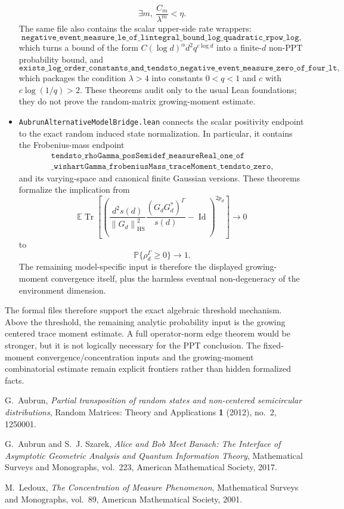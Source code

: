 \documentclass[11pt,reqno]{amsart}
\newcommand{\PP}{\mathbb P}
\newcommand{\EE}{\mathbb E}
\newcommand{\Tr}{\operatorname{Tr}}
\newcommand{\Id}{\operatorname{Id}}
\newcommand{\HS}{\mathrm{HS}}
\newcommand{\norm}[1]{\left\lVert #1\right\rVert}
\begin{document}
\begin{itemize}[leftmargin=*]
\[    \exists m,\ \frac{C_m}{\lambda^m}<\eta .
  \]
  The same file also contains the scalar upper-side rate wrappers:
  \[
    \texttt{negative\_event\_measure\_le\_of\_lintegral\_bound\_log\_quadratic\_rpow\_log},
  \]
  which turns a bound of the form
  \(C(\log d)^\alpha d^2q^{c\log d}\) into a finite-\(d\) non-PPT
  probability bound, and
  \[
    \texttt{exists\_log\_order\_constants\_and\_tendsto\_negative\_event\_measure\_zero\_of\_four\_lt},
  \]
  which packages the condition \(\lambda>4\) into constants
  \(0<q<1\) and \(c\) with \(c\log(1/q)>2\).  These theorems audit only to
  the usual Lean foundations; they do not prove the random-matrix
  growing-moment estimate.
\item \texttt{AubrunAlternativeModelBridge.lean} connects the scalar
  positivity endpoint to the exact random induced state normalization.  In
  particular, it contains the Frobenius-mass endpoint
  \[
  \begin{gathered}
    \texttt{tendsto\_rhoGamma\_posSemidef\_measureReal\_one\_of}\\
    \texttt{\_wishartGamma\_frobeniusMass\_traceMoment\_tendsto\_zero},
  \end{gathered}
  \]
  and its varying-space and canonical finite Gaussian versions.  These
  theorems formalize the implication from
  \[
    \EE\Tr\left[
      \left(
        \frac{d^2s(d)}{\norm{G_d}_{\HS}^2}
        \frac{(G_dG_d^*)^\Gamma}{s(d)}
        -\Id
      \right)^{2p_d}
    \right]\longrightarrow0
  \]
  to
  \[
    \PP\{\rho_d^\Gamma\ge0\}\longrightarrow1.
  \]
  The remaining model-specific input is therefore the displayed
  growing-moment convergence itself, plus the harmless eventual
  non-degeneracy of the environment dimension.
\end{itemize}

The formal files therefore support the exact algebraic threshold mechanism.
Above the threshold, the remaining analytic probability input is the growing
centered trace moment estimate.  A full operator-norm edge theorem would be
stronger, but it is not logically necessary for the PPT conclusion.
The fixed-moment convergence/concentration inputs and the growing-moment
combinatorial estimate remain explicit frontiers rather than hidden
formalized facts.

\begin{thebibliography}{9}

G.~Aubrun,
\emph{Partial transposition of random states and non-centered semicircular
distributions},
Random Matrices: Theory and Applications \textbf{1} (2012), no.~2, 1250001.

G.~Aubrun and S.~J. Szarek,
\emph{Alice and Bob Meet Banach: The Interface of Asymptotic Geometric
Analysis and Quantum Information Theory},
Mathematical Surveys and Monographs, vol.~223, American Mathematical Society,
2017.

M.~Ledoux,
\emph{The Concentration of Measure Phenomenon},
Mathematical Surveys and Monographs, vol.~89, American Mathematical Society,
2001.

\end{thebibliography}
\end{document}
